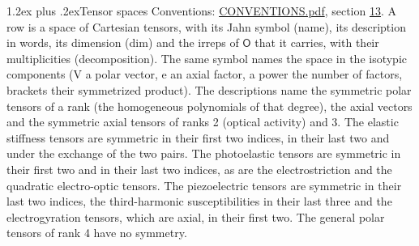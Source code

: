 \documentclass[10pt,a4paper]{article}
\makeatletter
\renewcommand\section{\@startsection{section}{1}{\z@}{-3ex plus -1ex minus -.2ex}%
  {1.2ex plus .2ex}{\normalfont\large\sffamily\bfseries\color{parttitle}}}
\numberwithin{equation}{section}
\newcommand{\grp}[1]{\mathsf{#1}}
\makeatother
\begin{document}
\section{Tensor spaces}\label{s:tensor_spaces}
Conventions: \href{../../CONVENTIONS.pdf}{CONVENTIONS.pdf}, section \href{../../CONVENTIONS.pdf\#conv.13}{13}.
\leavevmode\label{n:head.name}\label{n:head.description}\label{n:head.dim}\label{n:head.decomposition}A row is a space of Cartesian tensors, with its Jahn symbol (name), its description in words, its dimension (dim) and the irreps of $\grp{O}$ that it carries, with their multiplicities (decomposition). \label{n:label.jahn}The same symbol names the space in the isotypic components (V a polar vector, e an axial factor, a power the number of factors, brackets their symmetrized product). The descriptions name the symmetric polar tensors of a rank (the homogeneous polynomials of that degree), the axial vectors and the symmetric axial tensors of ranks 2 (optical activity) and 3. The elastic stiffness tensors are symmetric in their first two indices, in their last two and under the exchange of the two pairs. The photoelastic tensors are symmetric in their first two and in their last two indices, as are the electrostriction and the quadratic electro-optic tensors. The piezoelectric tensors are symmetric in their last two indices, the third-harmonic susceptibilities in their last three and the electrogyration tensors, which are axial, in their first two. The general polar tensors of rank 4 have no symmetry.
\end{document}
